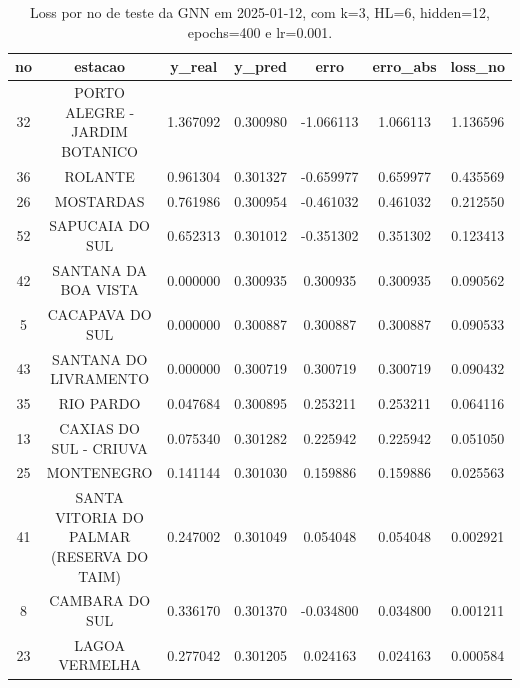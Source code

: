 \begin{table}[h]
\centering
\caption{Loss por no de teste da GNN em 2025-01-12, com k=3, HL=6, hidden=12, epochs=400 e lr=0.001.}
\label{tab:gnn_loss_k3_hl6_h12_e400_d20250112}
\begin{tabular}{ccccccc}
\toprule
no & estacao & y\_real & y\_pred & erro & erro\_abs & loss\_no \\
\midrule
32 & PORTO ALEGRE - JARDIM BOTANICO & 1.367092 & 0.300980 & -1.066113 & 1.066113 & 1.136596 \\
36 & ROLANTE & 0.961304 & 0.301327 & -0.659977 & 0.659977 & 0.435569 \\
26 & MOSTARDAS & 0.761986 & 0.300954 & -0.461032 & 0.461032 & 0.212550 \\
52 & SAPUCAIA DO SUL & 0.652313 & 0.301012 & -0.351302 & 0.351302 & 0.123413 \\
42 & SANTANA DA BOA VISTA & 0.000000 & 0.300935 & 0.300935 & 0.300935 & 0.090562 \\
5 & CACAPAVA DO SUL & 0.000000 & 0.300887 & 0.300887 & 0.300887 & 0.090533 \\
43 & SANTANA DO LIVRAMENTO & 0.000000 & 0.300719 & 0.300719 & 0.300719 & 0.090432 \\
35 & RIO PARDO & 0.047684 & 0.300895 & 0.253211 & 0.253211 & 0.064116 \\
13 & CAXIAS DO SUL - CRIUVA & 0.075340 & 0.301282 & 0.225942 & 0.225942 & 0.051050 \\
25 & MONTENEGRO & 0.141144 & 0.301030 & 0.159886 & 0.159886 & 0.025563 \\
41 & SANTA VITORIA DO PALMAR (RESERVA DO TAIM) & 0.247002 & 0.301049 & 0.054048 & 0.054048 & 0.002921 \\
8 & CAMBARA DO SUL & 0.336170 & 0.301370 & -0.034800 & 0.034800 & 0.001211 \\
23 & LAGOA VERMELHA & 0.277042 & 0.301205 & 0.024163 & 0.024163 & 0.000584 \\
\bottomrule
\end{tabular}
\end{table}
